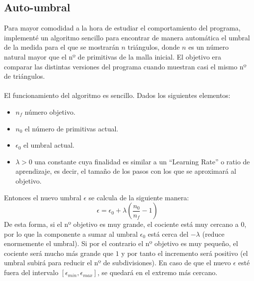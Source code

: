 \subsection*{Auto-umbral}
Para mayor comodidad a la hora de estudiar el comportamiento del programa, implementé un algoritmo sencillo para encontrar de manera automática el umbral de la medida para el que se mostrarán $n$ triángulos, donde $n$ es un número natural mayor que el nº de primitivas de la malla inicial. El objetivo era comparar las distintas versiones del programa cuando muestran casi el mismo nº de triángulos.\\
\\El funcionamiento del algoritmo es sencillo. Dados los siguientes elementos:
\begin{itemize}
	\item $n_f$ número objetivo.
	\item $n_0$ el número de primitivas actual.
	\item $\epsilon_0$ el umbral actual.
	\item $\lambda >0$ una constante cuya finalidad es similar a un ``Learning Rate'' o ratio de aprendizaje, es decir, el tamaño de los pasos con los que se aproximará al objetivo.
\end{itemize}
Entonces el nuevo umbral $\epsilon$ se calcula de la siguiente manera:
$$\epsilon = \epsilon_0 + \lambda (\frac{n_0}{n_f} - 1)$$
De esta forma, si el nº objetivo es muy grande, el cociente está muy cercano a $0$, por lo que la componente a sumar al umbral $\epsilon_0$ está cerca del $-\lambda$ (reduce enormemente el umbral). Si por el contrario el nº objetivo es muy pequeño, el cociente será mucho más grande que $1$ y por tanto el incremento será positivo (el umbral subirá para reducir el nº de subdivisiones). En caso de que el nuevo $\epsilon$ esté fuera del intervalo $[\epsilon_{min}, \epsilon_{max}]$, se quedará en el extremo más cercano.

\endinput
